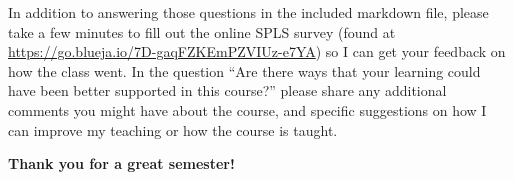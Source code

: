 \documentclass[10pt]{article}
\begin{document}
\vspace{2mm}
\noindent
In addition to answering those questions in the included markdown
file, please take a few minutes to fill out the online SPLS survey
(found at
\href{https://go.blueja.io/7D-gaqFZKEmPZVIUz-e7YA}{https://go.blueja.io/7D-gaqFZKEmPZVIUz-e7YA})
so I can get your feedback on how the class went.  In the question
``Are there ways that your learning could have been better supported
in this course?'' please share any additional comments you might have
about the course, and specific suggestions on how I can improve my
teaching or how the course is taught.

\vspace{3mm}

\noindent
\textbf{Thank you for a great semester!}
\end{document}
